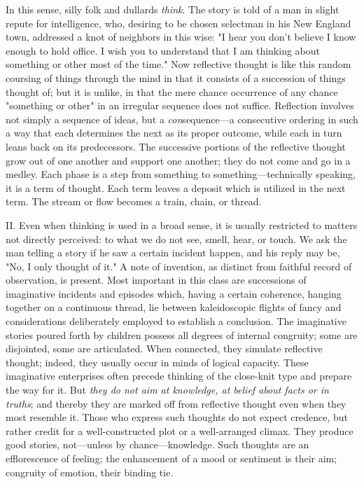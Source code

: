 \documentclass[letterpaper]{book}
\begin{document}

In this sense, silly folk and dullards \emph{think}. The story is told
of a man in slight repute for intelligence, who, desiring to be chosen
selectman in his New England town, addressed a knot of neighbors in this
wise: "I hear you don't believe I know enough to hold office. I wish you
to understand that I am thinking about something or other most of the
time." Now reflective thought is like this random coursing of things
through the mind in that it consists of a succession of things thought
of; but it is unlike, in that the mere chance occurrence of any chance
"something or other" in an irregular sequence does not suffice.
Reflection involves not simply a sequence of ideas, but a
\emph{con}sequence---a consecutive ordering in such a way
that
each determines the next as its proper outcome, while each in turn leans
back on its predecessors. The successive portions of the reflective
thought grow out of one another and support one another; they do not
come and go in a medley. Each phase is a step from something to
something---technically speaking, it is a term of thought. Each term
leaves a deposit which is utilized in the next term. The stream or flow
becomes a train, chain, or thread.


II. Even when thinking is used in a broad sense, it is usually
restricted to matters not directly perceived: to what we do not see,
smell, hear, or touch. We ask the man telling a story if he saw a
certain incident happen, and his reply may be, "No, I only thought of
it." A note of invention, as distinct from faithful record of
observation, is present. Most important in this class are successions of
imaginative incidents and episodes which, having a certain coherence,
hanging together on a continuous thread, lie between kaleidoscopic
flights of fancy and considerations deliberately employed to establish a
conclusion. The imaginative stories poured forth by children possess all
degrees of internal congruity; some are disjointed, some are
articulated. When connected, they simulate reflective thought; indeed,
they usually occur in minds of logical capacity. These imaginative
enterprises often precede thinking of the close-knit type and prepare
the way for it. 
But \emph{they do not aim at knowledge, at belief about
facts or in truths}; and thereby they are marked off from reflective
thought even when they most resemble it. Those who express such thoughts
do not expect credence, but rather credit for a well-constructed plot or
a well-arranged climax. They produce good stories, not---unless by
chance---knowledge.
Such thoughts are an efflorescence of feeling; the enhancement of a mood
or sentiment is their aim; congruity of emotion, their binding tie.
\end{document}
